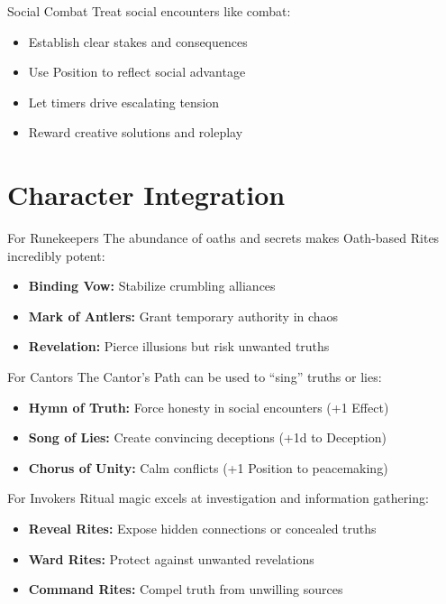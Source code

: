 \documentclass[11pt]{article}
\begin{document}
\begin{mechanicsbox}{Social Combat}
Treat social encounters like combat:
\begin{itemize}
    \item Establish clear stakes and consequences
    \item Use Position to reflect social advantage
    \item Let timers drive escalating tension
    \item Reward creative solutions and roleplay
\end{itemize}
\end{mechanicsbox}

\section*{Character Integration}

\begin{mechanicsbox}{For Runekeepers}
The abundance of oaths and secrets makes Oath-based Rites incredibly potent:
\begin{itemize}
    \item \textbf{Binding Vow:} Stabilize crumbling alliances
    \item \textbf{Mark of Antlers:} Grant temporary authority in chaos
    \item \textbf{Revelation:} Pierce illusions but risk unwanted truths
\end{itemize}
\end{mechanicsbox}

\begin{mechanicsbox}{For Cantors}
The Cantor's Path can be used to ``sing'' truths or lies:
\begin{itemize}
    \item \textbf{Hymn of Truth:} Force honesty in social encounters (+1 Effect)
    \item \textbf{Song of Lies:} Create convincing deceptions (+1d to Deception)
    \item \textbf{Chorus of Unity:} Calm conflicts (+1 Position to peacemaking)
\end{itemize}
\end{mechanicsbox}

\begin{mechanicsbox}{For Invokers}
Ritual magic excels at investigation and information gathering:
\begin{itemize}
    \item \textbf{Reveal Rites:} Expose hidden connections or concealed truths
    \item \textbf{Ward Rites:} Protect against unwanted revelations
    \item \textbf{Command Rites:} Compel truth from unwilling sources
\end{itemize}
\end{mechanicsbox}
\end{document}

